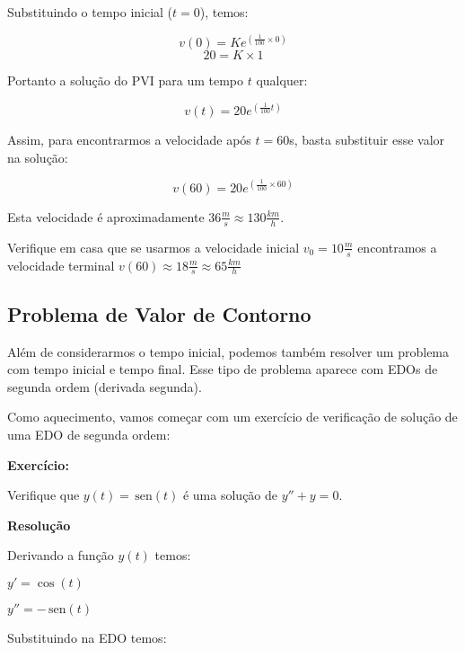 \documentclass[a4paper]{article}
\providecommand{\sin}{} \renewcommand{\sin}{\hspace{2pt}\mathrm{sen}}
\begin{document}
Substituindo o tempo inicial ($t=0$), temos:

\begin{displaymath}
  v(0) = Ke^{(\frac{1}{100}\times 0)}
\end{displaymath}
\begin{displaymath}
  20 = K \times 1
\end{displaymath}

Portanto a solução do PVI para um tempo $t$ qualquer:

\begin{displaymath}
  v(t) = 20e^{(\frac{1}{100}t)}
\end{displaymath}

Assim, para encontrarmos a velocidade após $t=60$s, basta substituir
esse valor na solução:

\begin{displaymath}
  v(60) = 20e^{(\frac{1}{100}\times 60)}
\end{displaymath}

Esta velocidade é aproximadamente $36\frac{m}{s} \approx 130\frac{km}{h}$.

Verifique em casa que se usarmos a velocidade inicial
$v_0=10\frac{m}{s}$ encontramos a velocidade terminal
$v(60) \approx 18\frac{m}{s} \approx 65\frac{km}{h}$

\subsection{Problema de Valor de Contorno}

Além de considerarmos o tempo inicial, podemos também resolver um
problema com tempo inicial e tempo final. Esse tipo de problema
aparece com EDOs de segunda ordem (derivada segunda).

Como aquecimento, vamos começar com um exercício de verificação de
solução de uma EDO de segunda ordem:

{\bf Exercício:}

Verifique que $y(t) = \sin (t)$ é uma solução de $y''+y=0$.

\bigskip

{\bf Resolução}


Derivando a função $y(t)$ temos:

$y' = \cos(t)$

$y'' = -\sin(t)$

Substituindo na EDO temos:
\end{document}
